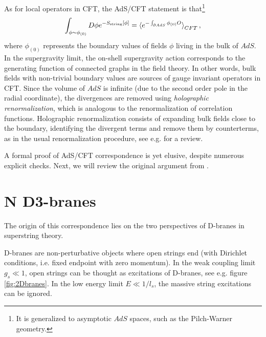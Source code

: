 As for local operators in CFT, the AdS/CFT statement is that\footnote{It is generalized to asymptotic $AdS$ spaces, such as the Pilch-Warner geometry.}
\begin{equation}
 \int_{\phi\sim\phi_{(0)}} D\phi e^{-S_\text{string}[\phi]} = \braket{e^{-\int_{\partial AdS} \phi_{(0)} O }}_{CFT},
\end{equation}
where $\phi_{(0)}$ represents the boundary values of fields $\phi$ living in the bulk of $AdS$.
In the supergravity limit, the on-shell supergravity action corresponds to the generating function of connected graphs in the field theory.
In other words, bulk fields with non-trivial boundary values are sources of gauge invariant operators in CFT.
Since the volume of $AdS$ is infinite (due to the second order pole in the radial coordinate),
the divergences are removed using \emph{holographic renormalization}, 
which is analogous to the renormalization of correlation functions.
Holographic renormalization consists of expanding bulk fields close to the boundary, 
identifying the divergent terms and remove them by counterterms, as in the usual renormalization procedure, see e.g. \cite{Skenderis:2002wp} for a review.

A formal proof of AdS/CFT correspondence is yet elusive, despite numerous explicit checks.
Next, we will review the original argument from \cite{Maldacena:1997re}.



\section{N D3-branes}

The origin of this correspondence lies on the two perspectives of D-branes in superstring theory.

D-branes are non-perturbative objects where open strings end (with Dirichlet conditions, i.e. fixed endpoint with zero momentum). 
In the weak coupling limit $g_s \ll 1$, 
open strings can be thought as excitations of D-branes, see e.g. figure \ref{fig:2Dbranes}.
In the low energy limit $E \ll 1/l_s$, the massive string excitations can be ignored.

